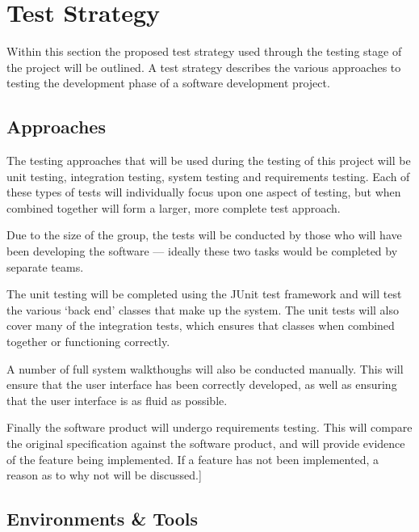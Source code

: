 \section{Test Strategy}
\label{sec:test_strategy}

Within this section the proposed test strategy used through the testing stage of 
the project will be outlined. A test strategy describes the various approaches 
to testing the development phase of a software development project. 


\subsection{Approaches}
\label{sub:approaches}

The testing approaches that will be used during the testing of this project will
be unit testing, integration testing, system testing and requirements testing. 
Each of these types of tests will individually focus upon one aspect of testing,
but when combined together will form a larger, more complete test approach.

Due to the size of the group, the tests will be conducted by those who will have
been developing the software --- ideally these two tasks would be completed by 
separate teams.

The unit testing will be completed using the JUnit test framework and will test
the various `back end' classes that make up the system. The unit tests will also
cover many of the integration tests, which ensures that classes when combined 
together or functioning correctly. 

A number of full system walkthoughs will also be conducted manually. This will 
ensure that the user interface has been correctly developed, as well as ensuring
that the user interface is as fluid as possible. 

Finally the software product will undergo requirements testing. This will 
compare the original specification against the software product, and will 
provide evidence of the feature being implemented. If a feature has not been 
implemented, a reason as to why not will be discussed.]


\subsection{Environments \& Tools}
\label{sub:environments_and_tools}

